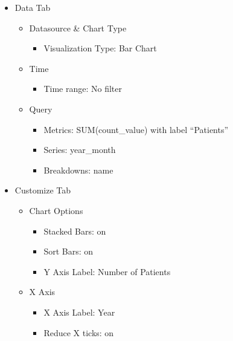 \documentclass[
]{book}
\providecommand{\tightlist}{%
  \setlength{\itemsep}{0pt}\setlength{\parskip}{0pt}}
\begin{document}
\begin{itemize}
\tightlist
\item
  Data Tab

  \begin{itemize}
  \tightlist
  \item
    Datasource \& Chart Type

    \begin{itemize}
    \tightlist
    \item
      Visualization Type: Bar Chart
    \end{itemize}
  \item
    Time

    \begin{itemize}
    \tightlist
    \item
      Time range: No filter
    \end{itemize}
  \item
    Query

    \begin{itemize}
    \tightlist
    \item
      Metrics: SUM(count\_value) with label ``Patients''
    \item
      Series: year\_month
    \item
      Breakdowns: name
    \end{itemize}
  \end{itemize}
\item
  Customize Tab

  \begin{itemize}
  \tightlist
  \item
    Chart Options

    \begin{itemize}
    \tightlist
    \item
      Stacked Bars: on
    \item
      Sort Bars: on
    \item
      Y Axis Label: Number of Patients
    \end{itemize}
  \item
    X Axis

    \begin{itemize}
    \tightlist
    \item
      X Axis Label: Year
    \item
      Reduce X ticks: on
    \end{itemize}
  \end{itemize}
\end{itemize}
\end{document}
